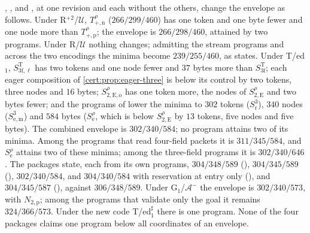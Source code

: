 , ,  and
, at one revision and each without the others,
change the envelope as follows. Under R$^{+2}$/$\mathcal U$, $T^{\rho}_{+,\mathrm n}$
($266/299/460$) has one token and one byte fewer and one node more than
$T^{\rho}_{+,\mathrm p}$; the envelope is $266/298/460$, attained by two programs.
Under R/$\mathcal U$ nothing changes; admitting the stream programs and across the two
encodings the minima become $239/255/460$, as  states. Under
T/ed$_1$, $S^{\mathrm T}_{3\mathrm f,\ell}$ has two tokens and one node fewer and $37$
bytes more than $S^{\mathrm T}_{3\mathrm f}$; each eager composition of
\cref{cert:prop:eager-three} is below its control by two tokens, three nodes and $16$
bytes; $S^{\rho}_{2,\mathrm{E,o}}$ has one token more, the nodes of
$S^{\rho}_{2,\mathrm E}$ and two bytes fewer; and the programs of 
lower the minima to $302$ tokens ($S^{3}_{\mathrm r}$), $340$ nodes
($S^{3}_{\mathrm{e,m}}$) and $584$ bytes ($S^{\rho}_{\mathrm e}$, which is below
$S^{\rho}_{2,\mathrm E}$ by $13$ tokens, five nodes and five bytes). The combined
envelope is $302/340/584$; no program attains two of its minima. Among the programs
that read four-field packets it is $311/345/584$, and $S^{\rho}_{\mathrm e}$ attains
two of these minima; among the three-field programs it is $302/340/646$. The packages
state, each from its own programs, $304/348/589$ (),
$304/345/589$ (), $302/340/584$, and $304/340/584$ with
reservation at entry only (), and $304/345/587$
(), against $306/348/589$. Under
G$_1$/$\mathcal A^{-}$ the envelope is $302/340/573$, with $N_{2,\mathrm p}$; among the
programs that validate only the goal it remains $324/366/573$. Under the new code
T/ed$_1^{\sharp}$ there is one program. None of the four packages claims one program
below all coordinates of an envelope.

